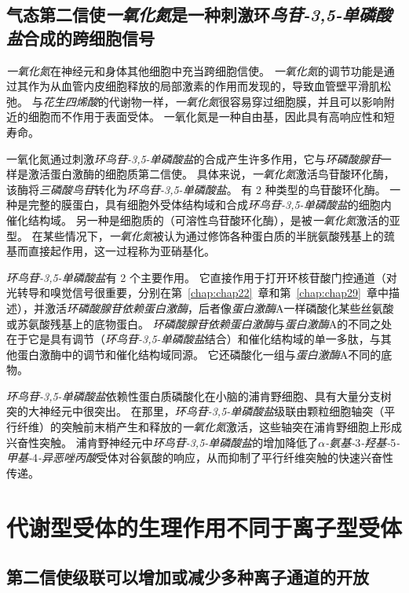 \subsection{气态第二信使\textit{一氧化氮}是一种刺激环\textit{鸟苷-3,5-单磷酸盐}合成的跨细胞信号}

\textit{一氧化氮}在神经元和身体其他细胞中充当跨细胞信使。
\textit{一氧化氮}的调节功能是通过其作为从血管内皮细胞释放的局部激素的作用而发现的，导致血管壁平滑肌松弛。
与\textit{花生四烯酸}的代谢物一样，\textit{一氧化氮}很容易穿过细胞膜，并且可以影响附近的细胞而不作用于表面受体。
一氧化氮是一种自由基，因此具有高响应性和短寿命。


一氧化氮通过刺激\textit{环鸟苷-3,5-单磷酸盐}的合成产生许多作用，它与\textit{环磷酸腺苷}一样是激活蛋白激酶的细胞质第二信使。
具体来说，\textit{一氧化氮}激活鸟苷酸环化酶，该酶将\textit{三磷酸鸟苷}转化为\textit{环鸟苷-3,5-单磷酸盐}。
有 2 种类型的鸟苷酸环化酶。
一种是完整的膜蛋白，具有细胞外受体结构域和合成\textit{环鸟苷-3,5-单磷酸盐}的细胞内催化结构域。
另一种是细胞质的（可溶性鸟苷酸环化酶），是被\textit{一氧化氮}激活的亚型。
在某些情况下，\textit{一氧化氮}被认为通过修饰各种蛋白质的半胱氨酸残基上的巯基而直接起作用，这一过程称为亚硝基化。


\textit{环鸟苷-3,5-单磷酸盐}有 2 个主要作用。
它直接作用于打开环核苷酸门控通道（对光转导和嗅觉信号很重要，分别在第~\ref{chap:chap22}~章和第~\ref{chap:chap29}~章中描述），并激活\textit{环磷酸腺苷依赖蛋白激酶}，后者像\textit{蛋白激酶}A一样磷酸化某些丝氨酸或苏氨酸残基上的底物蛋白。
\textit{环磷酸腺苷依赖蛋白激酶}与\textit{蛋白激酶}A的不同之处在于它是具有调节（\textit{环鸟苷-3,5-单磷酸盐}结合）和催化结构域的单一多肽，与其他蛋白激酶中的调节和催化结构域同源。
它还磷酸化一组与\textit{蛋白激酶}A不同的底物。


\textit{环鸟苷-3,5-单磷酸盐}依赖性蛋白质磷酸化在小脑的浦肯野细胞、具有大量分支树突的大神经元中很突出。
在那里，\textit{环鸟苷-3,5-单磷酸盐}级联由颗粒细胞轴突（平行纤维）的突触前末梢产生和释放的\textit{一氧化氮}激活，这些轴突在浦肯野细胞上形成兴奋性突触。
浦肯野神经元中\textit{环鸟苷-3,5-单磷酸盐}的增加降低了\textit{$\alpha$-氨基-}3\textit{-羟基-}5\textit{-甲基-}4\textit{-异恶唑丙酸}受体对谷氨酸的响应，从而抑制了平行纤维突触的快速兴奋性传递。



\section{代谢型受体的生理作用不同于离子型受体}

\subsection{第二信使级联可以增加或减少多种离子通道的开放}

